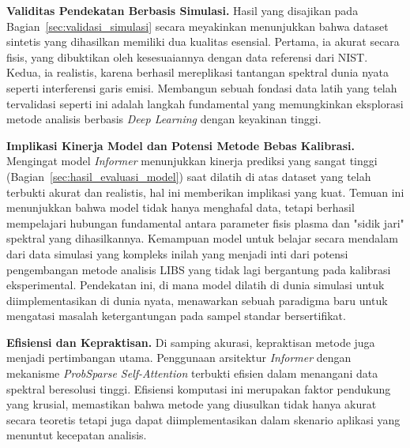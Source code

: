 \par\textbf{Validitas Pendekatan Berbasis Simulasi.} Hasil yang disajikan pada Bagian~\ref{sec:validasi_simulasi} secara meyakinkan menunjukkan bahwa dataset sintetis yang dihasilkan memiliki dua kualitas esensial. Pertama, ia akurat secara fisis, yang dibuktikan oleh kesesuaiannya dengan data referensi dari NIST. Kedua, ia realistis, karena berhasil mereplikasi tantangan spektral dunia nyata seperti interferensi garis emisi. Membangun sebuah fondasi data latih yang telah tervalidasi seperti ini adalah langkah fundamental yang memungkinkan eksplorasi metode analisis berbasis \textit{Deep Learning} dengan keyakinan tinggi.

\par\textbf{Implikasi Kinerja Model dan Potensi Metode Bebas Kalibrasi.} Mengingat model \textit{Informer} menunjukkan kinerja prediksi yang sangat tinggi (Bagian~\ref{sec:hasil_evaluasi_model}) saat dilatih di atas dataset yang telah terbukti akurat dan realistis, hal ini memberikan implikasi yang kuat. Temuan ini menunjukkan bahwa model tidak hanya menghafal data, tetapi berhasil mempelajari hubungan fundamental antara parameter fisis plasma dan "sidik jari" spektral yang dihasilkannya. Kemampuan model untuk belajar secara mendalam dari data simulasi yang kompleks inilah yang menjadi inti dari potensi pengembangan metode analisis LIBS yang tidak lagi bergantung pada kalibrasi eksperimental. Pendekatan ini, di mana model dilatih di dunia simulasi untuk diimplementasikan di dunia nyata, menawarkan sebuah paradigma baru untuk mengatasi masalah ketergantungan pada sampel standar bersertifikat.

\par\textbf{Efisiensi dan Kepraktisan.} Di samping akurasi, kepraktisan metode juga menjadi pertimbangan utama. Penggunaan arsitektur \textit{Informer} dengan mekanisme \textit{ProbSparse Self-Attention} terbukti efisien dalam menangani data spektral beresolusi tinggi. Efisiensi komputasi ini merupakan faktor pendukung yang krusial, memastikan bahwa metode yang diusulkan tidak hanya akurat secara teoretis tetapi juga dapat diimplementasikan dalam skenario aplikasi yang menuntut kecepatan analisis.